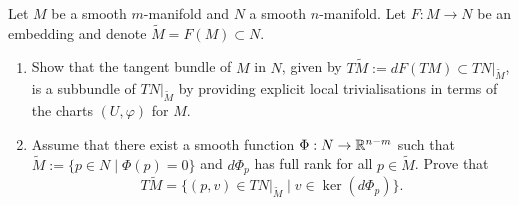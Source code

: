 \begin{exercise}[\textit{[homework 2]}]
  Let $M$ be a smooth $m$-manifold and $N$ a smooth $n$-manifold.
  Let $F:M\to N$ be an embedding and denote $\widetilde M = F(M)\subset N$.
  \begin{enumerate}
    \item Show that the tangent bundle of $M$ in $N$, given by $T\widetilde M := dF(TM) \subset TN\big|_{\widetilde M}$, is a subbundle of $TN\big|_{\widetilde M}$ by providing explicit local trivialisations in terms of the charts $(U, \varphi)$ for $M$.
    \item Assume that there exist a smooth function $\Phi:N\to\mathbb{R}^{n-m}$ such that $\widetilde M := \{p\in N \mid \Phi(p) = 0\}$ and $d\Phi_p$ has full rank for all $p\in\widetilde M$. Prove that
    \begin{equation}
      T\widetilde{M} = \{(p,v)\in TN|_{\widetilde{M}} \mid v\in\ker(d\Phi_p)\}.
    \end{equation}
  \end{enumerate}
\end{exercise}
